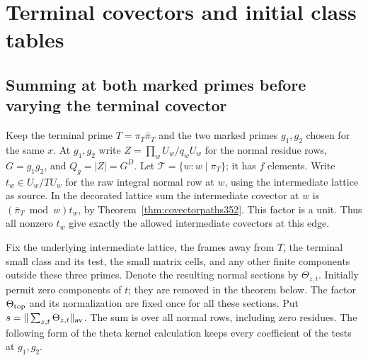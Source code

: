 \documentclass[a4paper,11pt]{article}
\theoremstyle{definition}
\theoremstyle{remark}
\numberwithin{equation}{section}
\begin{document}
\section{Terminal covectors and initial class tables}\label{nav:chapter-terminal-covectors}

\subsection{Summing at both marked primes before varying the terminal covector}
\label{sec:refinednormal390}

Keep the terminal prime \(T=\pi_T\bar\pi_T\) and the two marked
primes \(g_1,g_2\) chosen for the same \(x\). At \(g_1,g_2\)
write \(Z=\prod_w U_w/q_w U_w\) for the normal residue rows,
\(G=g_1g_2\), and \(Q_g=|Z|=G^D\). Let
\(\mathcal T=\{w:w\mid\pi_T\}\); it has \(f\) elements. Write
\(t_w\in U_w/TU_w\) for the raw integral normal row at \(w\),
using the intermediate lattice as source. In the decorated
lattice sum the intermediate covector at \(w\) is
\((\bar\pi_T\bmod w)t_w\), by Theorem~\ref{thm:covectorpaths352}.
This factor is a unit. Thus all nonzero \(t_w\) give exactly the
allowed intermediate covectors at this edge.

Fix the underlying intermediate lattice, the frames away from
\(T\), the terminal small class and its test, the small matrix
cells, and any other finite components outside these three
primes. Denote the resulting normal sections by
\(\Theta_{z,t}\). Initially permit zero components of \(t\);
they are removed in the theorem below. The factor
\(\Theta_{\rm top}\) and its normalization are fixed once for
all these sections. Put \(s=\|\sum_{z,t}\Theta_{z,t}\|_{\rm av}\).
The sum is over all normal rows, including zero residues. The
following form of the theta kernel calculation keeps every
coefficient of the tests at \(g_1,g_2\).
\end{document}
